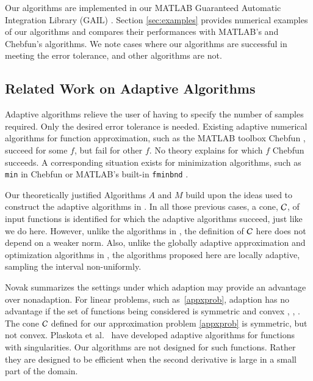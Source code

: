 \documentclass[review]{elsarticle}
\theoremstyle{definition}
\begin{document}
Our algorithms are implemented in our MATLAB Guaranteed Automatic
Integration Library (GAIL) \cite{ChoEtal15a}. Section \ref{sec:examples}
provides numerical examples of our algorithms and compares their
performances with MATLAB's and Chebfun's algorithms. We note cases where our
algorithms are successful in meeting the error tolerance, and other
algorithms are not.

\subsection{Related Work on Adaptive Algorithms}

Adaptive algorithms relieve the user of having to specify the number of samples
required. Only the desired error tolerance is needed. Existing adaptive
numerical algorithms for function approximation, such as the MATLAB toolbox
Chebfun \citep{TrefEtal16a}, succeed for some $f$, but fail for other $f$. No
theory explains for which $f$ Chebfun succeeds. A corresponding situation exists
for minimization algorithms, such as \texttt{min} in Chebfun or MATLAB's
built-in \texttt{fminbnd} \citep{MAT9.0}.

Our theoretically justified Algorithms $A$ and $M$ build upon the ideas used to
construct the adaptive algorithms in \cite{HicEtal14b, Din15a, HicEtal14a,
HicJim16a, Jia16a, JimHic16a,Ton14a}. In all those previous cases, a
cone, $\mathcal{C}$, of input functions is identified for which the adaptive algorithms
succeed, just like we do here. However, unlike the algorithms in \cite{HicEtal14b, Din15a,
HicEtal14a,Ton14a}, the definition of $\mathcal{C}$ here does not 
depend on a weaker norm. Also, unlike
the globally adaptive approximation and optimization algorithms in
\cite{HicEtal14b,Ton14a}, the algorithms proposed here are locally adaptive,
sampling the interval non-uniformly.

Novak \cite{Nov96a} summarizes the settings under which adaption may provide an
advantage over nonadaption. For linear problems, such as~\eqref{appxprob},
adaption has no advantage if the set of functions being considered is symmetric
and convex \cite[Theorem 1]{Nov96a}, \cite[Chapter 4, Theorem
5.2.1]{TraWasWoz88}, \cite{Woz88a}. 
The cone $\mathcal{C}$ defined for our approximation 
problem
\eqref{appxprob} is symmetric, but not convex. Plaskota et al.~\cite{PlaEtal08a}
have developed adaptive algorithms for functions with singularities. Our
algorithms are not designed for such functions. Rather they are
designed to be efficient when the second derivative is large in a small part of
the domain.
\end{document}
